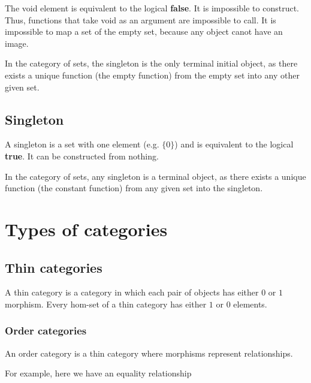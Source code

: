 \documentclass[preview]{standalone}
\begin{document}
The void element is equivalent to the logical \textbf{false}.
It is impossible to construct. Thus, functions that take void
as an argument are impossible to call.
It is impossible to map a set of the empty set, because
any object canot have an image.

In the category of sets, the singleton is the only terminal initial object,
as there exists a unique function (the empty function) from the empty set
into any other given set.

\subsection{Singleton}

A singleton is a set with one element (e.g. \(\{0\}\)) and
is equivalent to the logical \textbf{true}.
It can be constructed from nothing.

In the category of sets, any singleton is a terminal object,
as there exists a unique function (the constant function) from any given
set into the singleton.


\section{Types of categories}

\subsection{Thin categories}

A thin category is a category in which each pair of objects
has either \(0\) or \(1\) morphism.
Every hom-set of a thin category has either \(1\) or \(0\) elements.

\subsubsection{Order categories}

An order category is a thin category where morphisms represent relationships.

For example, here we have an equality relationship

\begin{center}
\end{center}
\end{document}
